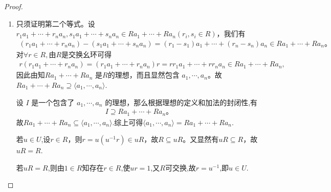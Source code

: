 \documentclass[../../main.tex]{subfiles}%
\begin{document}
\begin{proof}
\begin{enumerate}[(1)]
\item 只须证明第二个等式。设 $r_1a_1 + \cdots + r_na_n, s_1a_1 + \cdots + s_na_n \in Ra_1+\cdots+Ra_n(r_i, s_i \in R)$，我们有
\begin{align*}
(r_1a_1 + \cdots + r_na_n) - (s_1a_1 + \cdots + s_na_n) = (r_1 - s_1)a_1 + \cdots + (r_n - s_n)a_n \in Ra_1 + \cdots + Ra_n 。
\end{align*}
对$\forall r\in R,$由$R$是交换幺环可得
\begin{align*}
r\left( r_1a_1+\cdots +r_na_n \right) =\left( r_1a_1+\cdots +r_na_n \right) r=rr_1a_1+\cdots +rr_na_n\in Ra_1+\cdots +Ra_n,
\end{align*}
因此由知$Ra_1 + \cdots + Ra_n$ 是$R$的理想，而且显然包含 $a_1, \cdots, a_n$。故$Ra_1+\cdots +Ra_n\supseteq \langle a_1,\cdots ,a_n\rangle.$

设 $I$ 是一个包含了 $a_1, \cdots, a_n$ 的理想，那么根据理想的定义和加法的封闭性,有
\begin{align*}
I \supseteq Ra_1 + \cdots + Ra_n 。
\end{align*}
故$Ra_1+\cdots +Ra_n\subseteq \langle a_1,\cdots ,a_n\rangle$.综上可得$\langle a_1,\cdots ,a_n\rangle =Ra_1+\cdots +Ra_n.$

若$u\in U$,设$r\in R$，则$r=u(u^{-1}r)\in uR$，故$R\subseteq uR$。又显然有$uR\subseteq R$，故$uR=R$.

若$uR=R$,则由$1\in R$知存在$r\in R$,使$ur=1$,又$R$可交换,故$r=u^{-1}$,即$u\in U$.
\end{enumerate}
\end{proof}
\end{document}

